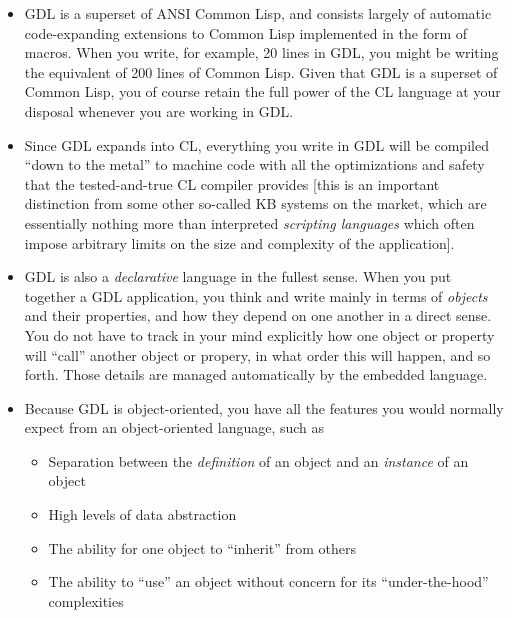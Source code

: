 \documentclass [11pt]{book}
\begin{document}
\begin{itemize}

\item GDL is a superset of ANSI Common Lisp, and consists largely of
automatic code-expanding extensions to Common Lisp implemented in the
form of macros. When you write, for example, 20 lines in GDL, you
might be writing the equivalent of 200 lines of Common Lisp. Given
that GDL is a superset of Common Lisp, you of course retain the
full power of the CL language at your disposal whenever you are
working in GDL.
\item Since GDL expands into CL, everything you write in GDL will
be compiled ``down to the metal'' to machine code with all the
optimizations and safety that the tested-and-true CL compiler provides
[this is an important distinction from some other so-called KB systems
on the market, which are essentially nothing more than interpreted \emph{scripting languages} which often impose arbitrary limits on
the size and complexity of the application].

\item GDL is also a \emph{declarative} language in the fullest sense. When you put together a
GDL application, you think and write mainly in terms of \emph{objects} and their properties, and how they depend on one another
in a direct sense. You do not have to track in your mind explicitly
how one object or property will ``call'' another object or propery, in
what order this will happen, and so forth. Those details are managed
automatically by the embedded language.

\item Because GDL is object-oriented, you have all the features you would normally expect
from an object-oriented language, such as 

\begin{itemize}

\item Separation between the \emph{definition} of an object and an \emph{instance} of an object

\item High levels of data abstraction

\item The ability for one object to ``inherit'' from others

\item The ability to ``use'' an object without concern for
	its ``under-the-hood'' complexities

\end{itemize}


\end{itemize}
\end{document}
